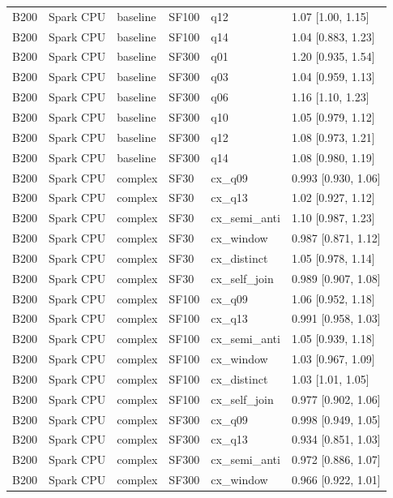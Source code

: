\begin{longtable}{llllll}
B200 & Spark CPU & baseline & SF100 & q12 & 1.07 [1.00, 1.15] \\
B200 & Spark CPU & baseline & SF100 & q14 & 1.04 [0.883, 1.23] \\
B200 & Spark CPU & baseline & SF300 & q01 & 1.20 [0.935, 1.54] \\
B200 & Spark CPU & baseline & SF300 & q03 & 1.04 [0.959, 1.13] \\
B200 & Spark CPU & baseline & SF300 & q06 & 1.16 [1.10, 1.23] \\
B200 & Spark CPU & baseline & SF300 & q10 & 1.05 [0.979, 1.12] \\
B200 & Spark CPU & baseline & SF300 & q12 & 1.08 [0.973, 1.21] \\
B200 & Spark CPU & baseline & SF300 & q14 & 1.08 [0.980, 1.19] \\
B200 & Spark CPU & complex & SF30 & cx\_q09 & 0.993 [0.930, 1.06] \\
B200 & Spark CPU & complex & SF30 & cx\_q13 & 1.02 [0.927, 1.12] \\
B200 & Spark CPU & complex & SF30 & cx\_semi\_anti & 1.10 [0.987, 1.23] \\
B200 & Spark CPU & complex & SF30 & cx\_window & 0.987 [0.871, 1.12] \\
B200 & Spark CPU & complex & SF30 & cx\_distinct & 1.05 [0.978, 1.14] \\
B200 & Spark CPU & complex & SF30 & cx\_self\_join & 0.989 [0.907, 1.08] \\
B200 & Spark CPU & complex & SF100 & cx\_q09 & 1.06 [0.952, 1.18] \\
B200 & Spark CPU & complex & SF100 & cx\_q13 & 0.991 [0.958, 1.03] \\
B200 & Spark CPU & complex & SF100 & cx\_semi\_anti & 1.05 [0.939, 1.18] \\
B200 & Spark CPU & complex & SF100 & cx\_window & 1.03 [0.967, 1.09] \\
B200 & Spark CPU & complex & SF100 & cx\_distinct & 1.03 [1.01, 1.05] \\
B200 & Spark CPU & complex & SF100 & cx\_self\_join & 0.977 [0.902, 1.06] \\
B200 & Spark CPU & complex & SF300 & cx\_q09 & 0.998 [0.949, 1.05] \\
B200 & Spark CPU & complex & SF300 & cx\_q13 & 0.934 [0.851, 1.03] \\
B200 & Spark CPU & complex & SF300 & cx\_semi\_anti & 0.972 [0.886, 1.07] \\
B200 & Spark CPU & complex & SF300 & cx\_window & 0.966 [0.922, 1.01] \\

\end{longtable}
